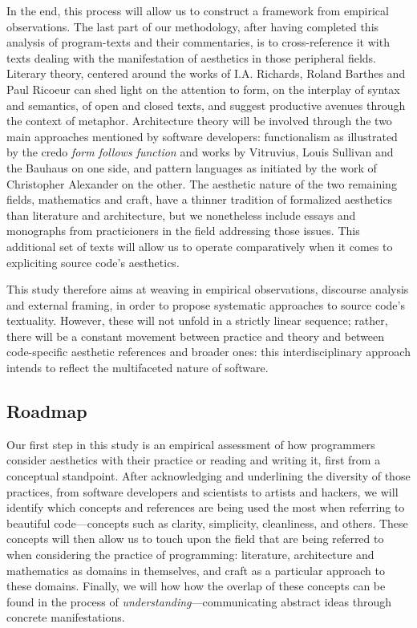 In the end, this process will allow us to construct a framework from empirical observations. The last part of our methodology, after having completed this analysis of program-texts and their commentaries, is to cross-reference it with texts dealing with the manifestation of aesthetics in those peripheral fields. Literary theory, centered around the works of I.A. Richards, Roland Barthes and Paul Ricoeur can shed light on the attention to form, on the interplay of syntax and semantics, of open and closed texts, and suggest productive avenues through the context of metaphor. Architecture theory will be involved through the two main approaches mentioned by software developers: functionalism as illustrated by the credo \emph{form follows function} and works by Vitruvius, Louis Sullivan and the Bauhaus on one side, and pattern languages as initiated by the work of Christopher Alexander on the other. The aesthetic nature of the two remaining fields, mathematics and craft, have a thinner tradition of formalized aesthetics than literature and architecture, but we nonetheless include essays and monographs from practicioners in the field addressing those issues. This additional set of texts will allow us to operate comparatively when it comes to expliciting source code's aesthetics.

This study therefore aims at weaving in empirical observations, discourse analysis and external framing, in order to propose systematic approaches to source code's textuality. However, these will not unfold in a strictly linear sequence; rather, there will be a constant movement between practice and theory and between code-specific aesthetic references and broader ones: this interdisciplinary approach intends to reflect the multifaceted nature of software.

\subsection{Roadmap}

Our first step in this study is an empirical assessment of how programmers consider aesthetics with their practice or reading and writing it, first from a conceptual standpoint. After acknowledging and underlining the diversity of those practices, from software developers and scientists to artists and hackers, we will identify which concepts and references are being used the most when referring to beautiful code—concepts such as clarity, simplicity, cleanliness, and others. These concepts will then allow us to touch upon the field that are being referred to when considering the practice of programming: literature, architecture and mathematics as domains in themselves, and craft as a particular approach to these domains. Finally, we will how how the overlap of these concepts can be found in the process of \emph{understanding}—communicating abstract ideas through concrete manifestations.

